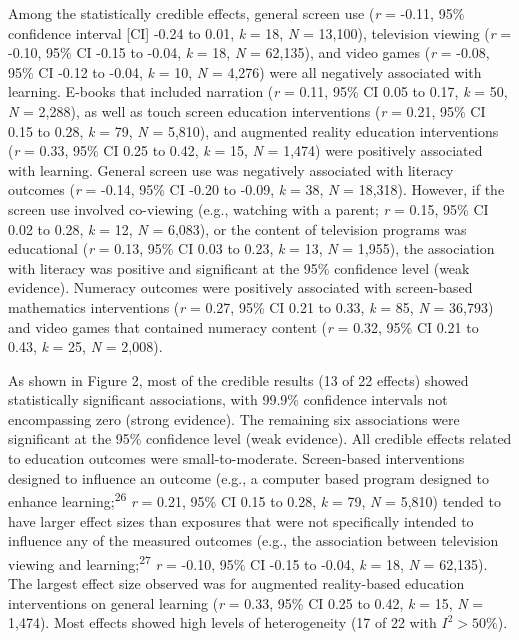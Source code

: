 \documentclass[
  english,
  man]{apa6}
\begin{document}
Among the statistically credible effects, general screen use (\emph{r} = -0.11, 95\% confidence interval {[}CI{]} -0.24 to 0.01, \emph{k} = 18, \emph{N} = 13,100), television viewing (\emph{r} = -0.10, 95\% CI -0.15 to -0.04, \emph{k} = 18, \emph{N} = 62,135), and video games (\emph{r} = -0.08, 95\% CI -0.12 to -0.04, \emph{k} = 10, \emph{N} = 4,276) were all negatively associated with learning.
E-books that included narration (\emph{r} = 0.11, 95\% CI 0.05 to 0.17, \emph{k} = 50, \emph{N} = 2,288), as well as touch screen education interventions (\emph{r} = 0.21, 95\% CI 0.15 to 0.28, \emph{k} = 79, \emph{N} = 5,810), and augmented reality education interventions (\emph{r} = 0.33, 95\% CI 0.25 to 0.42, \emph{k} = 15, \emph{N} = 1,474) were positively associated with learning.
General screen use was negatively associated with literacy outcomes (\emph{r} = -0.14, 95\% CI -0.20 to -0.09, \emph{k} = 38, \emph{N} = 18,318).
However, if the screen use involved co-viewing (e.g., watching with a parent; \emph{r} = 0.15, 95\% CI 0.02 to 0.28, \emph{k} = 12, \emph{N} = 6,083), or the content of television programs was educational (\emph{r} = 0.13, 95\% CI 0.03 to 0.23, \emph{k} = 13, \emph{N} = 1,955), the association with literacy was positive and significant at the 95\% confidence level (weak evidence).
Numeracy outcomes were positively associated with screen-based mathematics interventions (\emph{r} = 0.27, 95\% CI 0.21 to 0.33, \emph{k} = 85, \emph{N} = 36,793) and video games that contained numeracy content (\emph{r} = 0.32, 95\% CI 0.21 to 0.43, \emph{k} = 25, \emph{N} = 2,008).

As shown in Figure 2, most of the credible results (13 of 22 effects) showed statistically significant associations, with 99.9\% confidence intervals not encompassing zero (strong evidence).
The remaining six associations were significant at the 95\% confidence level (weak evidence).
All credible effects related to education outcomes were small-to-moderate.
Screen-based interventions designed to influence an outcome (e.g., a computer based program designed to enhance learning;\textsuperscript{26} \emph{r} = 0.21, 95\% CI 0.15 to 0.28, \emph{k} = 79, \emph{N} = 5,810) tended to have larger effect sizes than exposures that were not specifically intended to influence any of the measured outcomes (e.g., the association between television viewing and learning;\textsuperscript{27} \emph{r} = -0.10, 95\% CI -0.15 to -0.04, \emph{k} = 18, \emph{N} = 62,135).
The largest effect size observed was for augmented reality-based education interventions on general learning (\emph{r} = 0.33, 95\% CI 0.25 to 0.42, \emph{k} = 15, \emph{N} = 1,474).
Most effects showed high levels of heterogeneity (17 of 22 with \(I^2 > 50\%\)).
\end{document}
